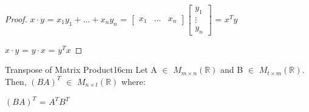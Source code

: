     \begin{proof}
        $x \cdot y$
        = $x_1y_1 + ... + x_ny_n$ =
        $\begin{bmatrix}
            x_1 & ... & x_n
        \end{bmatrix}
        \begin{bmatrix}
            y_1 \\
            \vdots \\
            y_n
        \end{bmatrix}$
        = $x^T y$

        $x \cdot y$ = $y \cdot x$ = $y^T x$
    \end{proof}

    \newpage



    \begin{wtheorem}{Transpose of Matrix Product}{16cm}
        Let A $\in$ $M_{m \times n}(\mathbb{R})$
        and B $\in$ $M_{t \times m}(\mathbb{R})$.
        Then, $(BA)^T$ $\in$ $M_{n \times t}(\mathbb{R})$ where:

        \hspace{0.5cm}
        $(BA)^T$ = $A^T B^T$
    \end{wtheorem}

